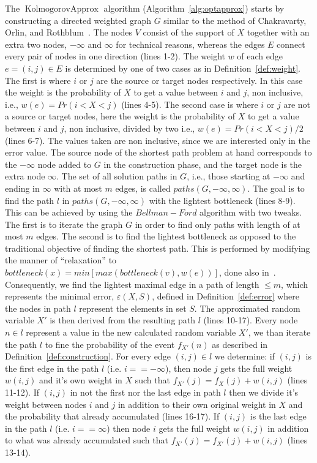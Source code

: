 \documentclass{article}
\DeclareMathOperator{\KlmApprox}{KolmogorovApprox}
\begin{document}
The $\KlmApprox$ algorithm (Algorithm~\ref{alg:optapprox}) starts by constructing a directed weighted graph $G$ similar to the method of Chakravarty, Orlin, and Rothblum~\cite{chakravarty1982partitioning}. The nodes $V$ consist of the support of $X$ together with an extra two nodes, $-\infty$ and $\infty$ for technical reasons, whereas the edges $E$ connect every pair of nodes in one direction (lines 1-2). The weight $w$ of each edge $e=(i,j)\in E$ is determined by one of two cases as in Definition~\ref{def:weight}. The first is where $i$ or $j$ are the source or target nodes respectively. In this case the weight is the probability of $X$ to get a value between $i$ and $j$, non inclusive, i.e., $w(e)=Pr(i<X<j)$ (lines 4-5). The second case is where $i$ or $j$ are not a source or target nodes, here the weight is the probability of $X$ to get a value between $i$ and $j$, non inclusive, divided by two i.e., $w(e)=Pr(i<X<j)/2$ (lines 6-7). The values taken are non inclusive, since we are interested only in the error value.
The source node of the shortest path problem at hand corresponds to the $-\infty$ node added to $G$ in the construction phase, and the target node is the extra node $\infty$.
The set of all solution paths in $G$, i.e., those starting at $-\infty$ and ending in $\infty$ with at most $m$ edges, is called $paths(G, -\infty, \infty)$. The goal is to find the path $l$ in $paths(G, -\infty, \infty)$ with the lightest bottleneck (lines 8-9). This can be achieved by using the $Bellman-Ford$ algorithm with two tweaks. The first is to iterate the graph $G$ in order to find only paths with length of at most $m$ edges. The second is to find the lightest bottleneck as opposed to the traditional objective of finding the shortest path. This is performed by modifying the manner of ``relaxation'' to $bottleneck(x) = min[max(bottleneck(v),w(e))]$, done also in~\cite{shufan2011two}. Consequently, we find the lightest maximal edge in a path of length $\leq m$, which represents the minimal error, $\varepsilon(X,S)$, defined in Definition~\ref{def:error} where the nodes in path $l$ represent the elements in set $S$. The approximated random variable $X'$ is then derived from the resulting path $l$ (lines 10-17). Every node $n \in l$ represent a value in the new calculated random variable $X'$, we than iterate the path $l$ to fine the probability of the event $f_{X'}(n)$ as described in Definition~\ref{def:construction}. For every edge $(i,j)\in l$ we determine: if $(i,j)$ is the first edge in the path $ l$ (i.e.  $i==-\infty$), then node $j$ gets the full weight $w(i,j)$ and it's own weight in $X$ such that $f_{X'}(j) = f_{X}(j) +  w(i,j)$ (lines 11-12). If $(i,j)$ in not the first nor the last edge in path $l$ then we divide it's weight between nodes $i$ and $j$ in addition to their own original weight in $X$ and the probability that already accumulated (lines 16-17). If $(i,j)$ is the last edge in the path $ l$ (i.e.  $i==\infty$) then node $i$ gets the full weight $w(i,j)$ in addition to what was already accumulated such that $f_{X'}(j) = f_{X'}(j) +  w(i,j)$ (lines 13-14).
\end{document}
